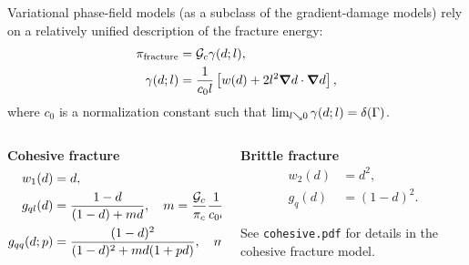 \begin{frame}{}
Variational phase-field models (as a subclass of the gradient-damage models) rely on a relatively unified description of the fracture energy:
\begin{align}
    \pi_{\text{fracture}} &= {\mathcal{G}_c} \gamma(d; l), \\
    \gamma(d; l) &= \dfrac{1}{c_0 l} \left[ w(d) + 2l^2 \boldsymbol{\nabla} d \cdot \boldsymbol{\nabla} d \right],
\end{align}
where $c_0$ is a normalization constant such that $\lim_{l \searrow 0} \gamma(d; l) = \delta(\Gamma)$. \\
\bigskip
\begin{columns}
    \begin{column}{0.5\textwidth}
        \begin{block}{\textbf{Cohesive fracture}}
        \vspace{-1em}
        \begin{align*}
            w_1(d) &= d, \\
            g_{ql}(d) &= \dfrac{1 - d}{(1 - d) + m d}, \quad m = \dfrac{{\mathcal{G}_c}}{\pi_c} \dfrac{1}{c_0 l}, \\
            g_{qq}(d; p) &= \dfrac{(1 - d)^2}{(1 - d)^2 + m d (1 + p d)}, \quad m = \dfrac{{\mathcal{G}_c}}{\pi_c} \dfrac{1}{c_0 l} \geqslant p + 2.
        \end{align*}
        \end{block}
    \end{column}
    \begin{column}{0.5\textwidth}
        \begin{block}{\textbf{Brittle fracture}}
        \vspace{-1em}
        \begin{align*}
            w_2(d) &= d^2, \\
            g_q(d) &= (1 - d)^2.
        \end{align*}
        \end{block}
        \begin{exampleblock}{}
            See \texttt{cohesive.pdf} for details in the cohesive fracture model.
        \end{exampleblock}
    \end{column}
\end{columns}
\end{frame}
